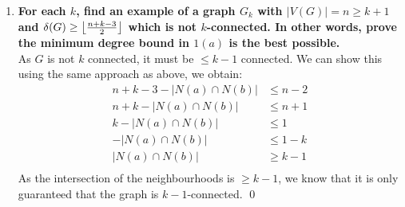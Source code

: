 \begin{enumerate}[label=\textbf{(\alph*)}]
    \boldmath
    \item \textbf{For each $k$, find an example of a graph $G_k$ with $|V(G)| = n \geq k + 1$ and $\delta(G) \geq \left\lfloor\frac{n + k - 3}{2}\right\rfloor$ which is not $k$-connected. In other words, prove the minimum degree bound in $1(a)$ is the best possible.} \\
    \unboldmath
    \linebreak 
    As $G$ is not $k$ connected, it must be $\leq k-1$ connected. We can show this using the same approach as above, we obtain: \\
    \linebreak
    \begin{align*}
    n + k - 3 - |N(a) \cap N(b)| &\leq n - 2 \\ 
    n + k - |N(a) \cap N(b)| &\leq n+1 \\
    k - |N(a) \cap N(b)| &\leq 1 \\
     - |N(a) \cap N(b)| &\leq 1 - k \\
     |N(a) \cap N(b)| &\geq k - 1\\
    \end{align*} 
As the intersection of the neighbourhoods is $\geq k-1$, we know that it is only guaranteed that the graph is $k-1$-connected. \qed 
\end{enumerate}
